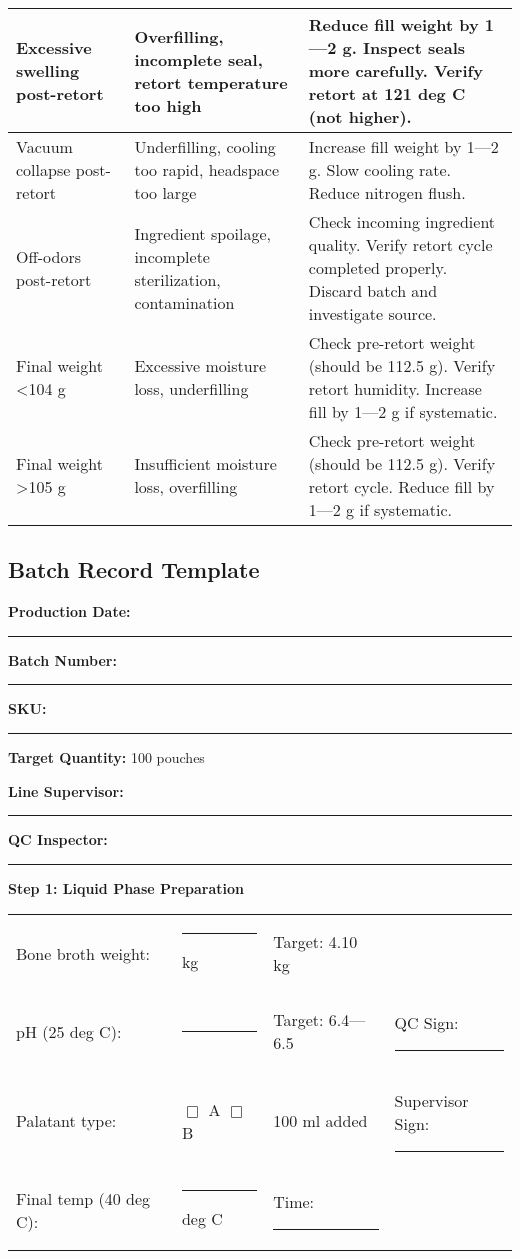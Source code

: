 {\begin{table}[h]
\begin{tabular}{@{}p{4cm}p{3.5cm}p{5cm}@{}}
Excessive swelling post-retort & Overfilling, incomplete seal, retort temperature too high & Reduce fill weight by 1---2 g. Inspect seals more carefully. Verify retort at 121 deg C (not higher). \\
\midrule
Vacuum collapse post-retort & Underfilling, cooling too rapid, headspace too large & Increase fill weight by 1---2 g. Slow cooling rate. Reduce nitrogen flush. \\
\midrule
Off-odors post-retort & Ingredient spoilage, incomplete sterilization, contamination & Check incoming ingredient quality. Verify retort cycle completed properly. Discard batch and investigate source. \\
\midrule
Final weight <104 g & Excessive moisture loss, underfilling & Check pre-retort weight (should be 112.5 g). Verify retort humidity. Increase fill by 1---2 g if systematic. \\
\midrule
Final weight >105 g & Insufficient moisture loss, overfilling & Check pre-retort weight (should be 112.5 g). Verify retort cycle. Reduce fill by 1---2 g if systematic. \\
\bottomrule
\end{tabular}
\end{table}


\clearpage
\subsection*{Batch Record Template}

\noindent\textbf{Production Date:} \rule{3cm}{0.4pt} \hspace{2cm} \textbf{Batch Number:} \rule{3cm}{0.4pt}

\noindent\textbf{SKU:} \rule{4cm}{0.4pt} \hspace{2cm} \textbf{Target Quantity:} 100 pouches

\noindent\textbf{Line Supervisor:} \rule{4cm}{0.4pt} \hspace{1cm} \textbf{QC Inspector:} \rule{4cm}{0.4pt}

\vspace{1em}

\noindent\textbf{Step 1: Liquid Phase Preparation}

\begin{tabular}{@{}lp{3cm}p{3cm}p{3cm}@{}}
Bone broth weight: & \rule{2.5cm}{0.4pt} kg & Target: 4.10 kg & \\
pH (25 deg C): & \rule{2.5cm}{0.4pt} & Target: 6.4---6.5 & QC Sign: \rule{2cm}{0.4pt} \\
Palatant type: & $\Box$ A $\Box$ B & 100 ml added & Supervisor Sign: \rule{2cm}{0.4pt} \\
Final temp (40 deg C): & \rule{2.5cm}{0.4pt} deg C & Time: \rule{2cm}{0.4pt} & \\
\end{tabular}

}

